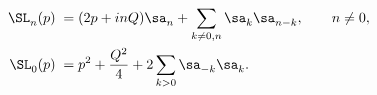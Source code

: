 \begin{equation}\label{FockVir}
\begin{aligned}\SL_n^{}(p)\;=\;& 
(2p+inQ)\sa_n^{}+\sum_{k\neq 0,n}\sa_k^{} \sa_{n-k}^{},
\qquad n\neq 0, \\
\SL_0^{}(p)\;=\;&p^2 +\frac{Q^2}{4}+
2\sum_{k>0}\sa_{-k}^{}\sa_k^{}. 
\end{aligned}
\end{equation}

